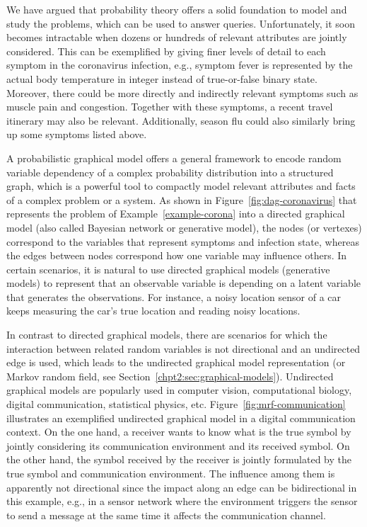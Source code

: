 We have argued that probability theory offers a solid foundation to model and study the problems, which can be used to answer queries. Unfortunately, it soon becomes intractable when dozens or hundreds of relevant attributes are jointly considered. This can be exemplified by giving finer levels of detail to each symptom in the coronavirus infection, e.g., symptom fever is represented by the actual body temperature in integer instead of true-or-false binary state. Moreover, there could be more directly and indirectly relevant symptoms such as muscle pain and congestion. Together with these symptoms, a recent travel itinerary may also be relevant. Additionally, season flu could also similarly bring up some symptoms listed above. 

A probabilistic graphical model offers a general framework to encode random variable dependency of a complex probability distribution into a structured graph, which is a powerful tool to compactly model relevant attributes and facts of a complex problem or a system. As shown in Figure~\ref{fig:dag-coronavirus} that represents the problem of Example~\ref{example-corona} into a directed graphical model (also called Bayesian network or generative model), the nodes (or vertexes) correspond to the variables that represent symptoms and infection state, whereas the edges between nodes correspond how one variable may influence others. In certain scenarios, it is natural to use directed graphical models (generative models) to represent that an observable variable is depending on a latent variable that generates the observations. For instance, a noisy location sensor of a car keeps measuring the car's true location and reading noisy locations. 

In contrast to directed graphical models, there are scenarios for which the interaction between related random variables is not directional and an undirected edge is used, which leads to the undirected graphical model representation (or Markov random field, see Section~\ref{chpt2:sec:graphical-models}). Undirected graphical models are popularly used in computer vision, computational biology, digital communication, statistical physics, etc. Figure~\ref{fig:mrf-communication} illustrates an exemplified undirected graphical model in a digital communication context. On the one hand, a receiver wants to know what is the true symbol by jointly considering its communication environment and its received symbol. On the other hand, the symbol received by the receiver is jointly formulated by the true symbol and communication environment. The influence among them is apparently not directional since the impact along an edge can be bidirectional in this example, e.g., in a sensor network where the environment triggers the sensor to send a message at the same time it affects the communication channel.

